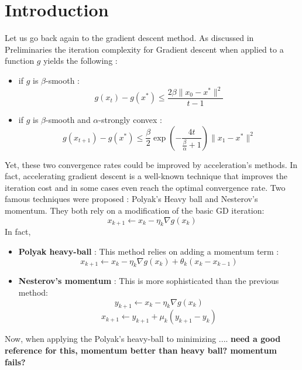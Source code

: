 \documentclass[12pt]{report}
\begin{document}
\section{Introduction}
Let us go back again to the gradient descent method. As discussed in Preliminaries the iteration complexity for Gradient descent when applied to a function $g$ yields the following :
\begin{itemize}
    \item if $g$ is $\beta$-smooth : 
    \begin{equation} \label{eq:smooth}
g(x_t)-g(x^*)\leq \frac{2\beta\| x_0-x^*\|^2}{t-1}
\end{equation}
    \item if $g$ is $\beta$-smooth and $\alpha$-strongly convex :\begin{equation} \label{eq:strg}
g(x_{t+1})-g(x^*)\leq \frac{\beta}{2}\exp(-\frac{4t}{\frac{\beta}{\alpha}+1})\| x_1-x^*\|^2
\end{equation} 
\end{itemize}
Yet, these two convergence rates could be improved by acceleration's methods.
In fact, accelerating gradient descent is a well-known technique that improves the iteration cost and in some cases even reach the optimal convergence rate.
Two famous techniques were proposed : Polyak's Heavy ball and Nesterov's momentum. They both rely on a modification of the basic GD iteration:
\begin{equation}\label{iteration}
    x_{k+1}\gets x_k-\eta_k\nabla g(x_k)
\end{equation}
In fact,
\begin{itemize}
    \item \textbf{Polyak heavy-ball} :
    This method relies on adding a momentum term :
    $$ x_{k+1}\gets x_k-\eta_k\nabla g(x_k)+{\theta_k(x_k-x_{k-1})}$$
    \item \textbf{Nesterov's momentum} : 
    This is more sophisticated than the previous method:
    $$y_{k+1}\gets x_k-\eta_k\nabla g(x_k)$$ $$x_{k+1}\gets y_{k+1}+\mu_k(y_{k+1}-y_k)$$
\end{itemize}

Now, when applying the Polyak's heavy-ball to minimizing .... \textbf{need a good reference for this, momentum better than heavy ball? momentum fails?}
\end{document}
